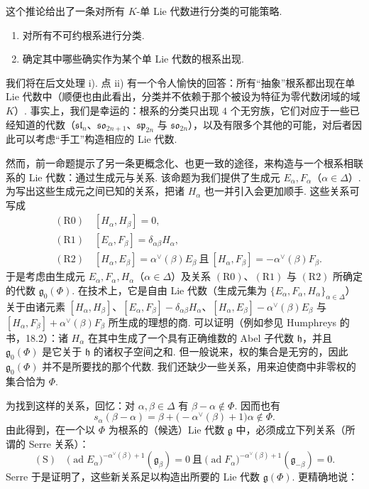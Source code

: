 \begin{numpara}[走向分类]\label{np:ssl-3-3-3}
这个推论给出了一条对所有 $K$-单 Lie 代数进行分类的可能策略.
\begin{enumerate}[label=\roman*)]
\item 对所有不可约根系进行分类.
\item 确定其中哪些确实作为某个单 Lie 代数的根系出现.
\end{enumerate}
我们将在后文处理 i). 点 ii) 有一个令人愉快的回答：所有``抽象''根系都出现在单 Lie 代数中（顺便也由此看出，分类并不依赖于那个被设为特征为零代数闭域的域 $K$）. 事实上，我们是幸运的：根系的分类只出现 $4$ 个无穷族，它们对应于一些已经知道的代数（$\mathfrak{sl}_n$、$\mathfrak{so}_{2n+1}$、$\mathfrak{sp}_{2n}$ 与 $\mathfrak{so}_{2n}$），以及有限多个其他的可能，对后者因此可以考虑``手工''构造相应的 Lie 代数.
\end{numpara}
\begin{numpara}[生成元与关系]\label{np:ssl-3-3-4}
然而，前一命题提示了另一条更概念化、也更一致的途径，来构造与一个根系相联系的 Lie 代数：通过生成元与关系. 该命题为我们提供了生成元 $E_{\alpha},F_{\alpha}$（$\alpha\in\Delta$）. 为写出这些生成元之间已知的关系，把诸 $H_{\alpha}$ 也一并引入会更加顺手. 这些关系可写成
\[
\begin{aligned}
&(\mathrm{R}0)\quad [H_{\alpha},H_{\beta}]=0,\\
&(\mathrm{R}1)\quad [E_{\alpha},F_{\beta}]=\delta_{\alpha\beta}H_{\alpha},\\
&(\mathrm{R}2)\quad [H_{\alpha},E_{\beta}]=\alpha^{\vee}(\beta)E_{\beta}\ \text{且}\ [H_{\alpha},F_{\beta}]=-\alpha^{\vee}(\beta)F_{\beta}.
\end{aligned}
\]
于是考虑由生成元 $E_{\alpha},F_{\alpha},H_{\alpha}$（$\alpha\in\Delta$）及关系 $(\mathrm{R}0)$、$(\mathrm{R}1)$ 与 $(\mathrm{R}2)$ 所确定的代数 $\mathfrak g_0(\Phi)$. 在技术上，它是自由 Lie 代数（生成元集为 $\{E_{\alpha},F_{\alpha},H_{\alpha}\}_{\alpha\in\Delta}$）关于由诸元素 $[H_{\alpha},H_{\beta}]$、$[E_{\alpha},F_{\beta}]-\delta_{\alpha\beta}H_{\alpha}$、$[H_{\alpha},E_{\beta}]-\alpha^{\vee}(\beta)E_{\beta}$ 与 $[H_{\alpha},F_{\beta}]+\alpha^{\vee}(\beta)F_{\beta}$ 所生成的理想的商. 可以证明（例如参见 Humphreys 的书，18.2）：诸 $H_{\alpha}$ 在其中生成了一个具有正确维数的 Abel 子代数 $\mathfrak h$，并且 $\mathfrak g_0(\Phi)$ 是它关于 $\mathfrak h$ 的诸权子空间之和. 但一般说来，权的集合是无穷的，因此 $\mathfrak g_0(\Phi)$ 并不是所要找的那个代数. 我们还缺少一些关系，用来迫使商中非零权的集合恰为 $\Phi$.

为找到这样的关系，回忆：对 $\alpha,\beta\in\Delta$ 有 $\beta-\alpha\notin\Phi$. 因而也有
\[s_{\alpha}(\beta-\alpha)=\beta+\bigl(-\alpha^{\vee}(\beta)+1\bigr)\alpha\notin\Phi.\]
由此得到，在一个以 $\Phi$ 为根系的（候选）Lie 代数 $\mathfrak g$ 中，必须成立下列关系（所谓的 Serre 关系）：
\[
(\mathrm S)\quad \bigl(\operatorname{ad}E_{\alpha}\bigr)^{-\alpha^{\vee}(\beta)+1}(\mathfrak g_{\beta})=0\ \text{且}\ \bigl(\operatorname{ad}F_{\alpha}\bigr)^{-\alpha^{\vee}(\beta)+1}(\mathfrak g_{-\beta})=0.
\]
Serre 于是证明了，这些新关系足以构造出所要的 Lie 代数 $\mathfrak g(\Phi)$. 更精确地说：
\end{numpara}

